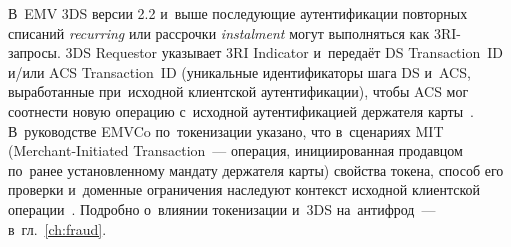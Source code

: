 В~EMV 3DS версии 2.2 и~выше
последующие аутентификации повторных списаний \textit{recurring} или рассрочки
\textit{instalment} могут выполняться как 3RI-запросы. 3DS Requestor указывает
3RI Indicator и~передаёт DS Transaction~ID и/или ACS Transaction~ID (уникальные
  идентификаторы шага DS и~ACS, выработанные при~исходной клиентской
аутентификации), чтобы ACS мог соотнести новую операцию с~исходной
аутентификацией держателя карты~\cite{emvco-3ds-recurring}. В~руководстве EMVCo
по~токенизации указано, что в~сценариях MIT (Merchant-Initiated Transaction~---
  операция, инициированная продавцом по~ранее установленному мандату держателя
карты) свойства токена, способ его проверки
и~доменные ограничения наследуют контекст исходной клиентской
операции~\cite{emvco-payment-tokenisation-guide}. Подробно о~влиянии
токенизации и~3DS на~антифрод~--- в~гл.~\ref{ch:fraud}.
